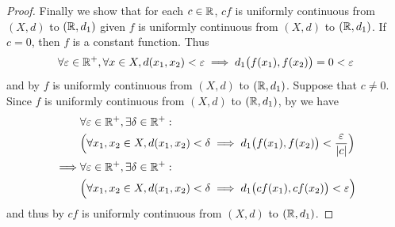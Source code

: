 \begin{proof}
  Finally we show that for each \(c \in \mathbb{R}\), \(cf\) is uniformly continuous from \((X, d)\) to \((\mathbb{R}, d_1)\) given \(f\) is uniformly continuous from \((X, d)\) to \((\mathbb{R}, d_1)\).
  If \(c = 0\), then \(f\) is a constant function.
  Thus
  \[
    \forall \varepsilon \in \mathbb{R}^+, \forall x \in X, d(x_1, x_2) < \varepsilon \implies d_1\big(f(x_1), f(x_2)\big) = 0 < \varepsilon
  \]
  and by  \(f\) is uniformly continuous from \((X, d)\) to \((\mathbb{R}, d_1)\).
  Suppose that \(c \neq 0\).
  Since \(f\) is uniformly continuous from \((X, d)\) to \((\mathbb{R}, d_1)\), by  we have
  \begin{align*}
             & \forall \varepsilon \in \mathbb{R}^+, \exists \delta \in \mathbb{R}^+:                                                                     \\
             & \Big(\forall x_1, x_2 \in X, d(x_1, x_2) < \delta \implies d_1\big(f(x_1), f(x_2)\big) < \dfrac{\varepsilon}{\left\lvert c\right\rvert}\Big) \\
    \implies & \forall \varepsilon \in \mathbb{R}^+, \exists \delta \in \mathbb{R}^+:                                                                     \\
             & \Big(\forall x_1, x_2 \in X, d(x_1, x_2) < \delta \implies d_1\big(cf(x_1), cf(x_2)\big) < \varepsilon\Big)
  \end{align*}
  and thus by  \(cf\) is uniformly continuous from \((X, d)\) to \((\mathbb{R}, d_1)\).
\end{proof}
